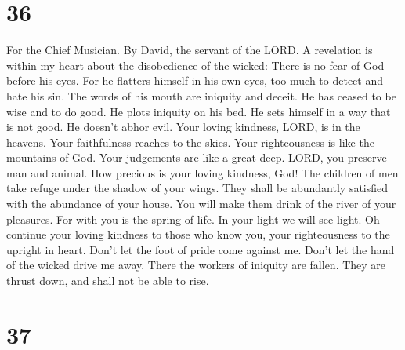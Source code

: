 \hypertarget{section-35}{%
\section{36}\label{section-35}}

For the Chief Musician. By David, the servant of the LORD. 
A revelation is within my heart about the disobedience of the wicked:
There is no fear of God before his eyes.  For he flatters
himself in his own eyes, too much to detect and hate his sin.
 The words of his mouth are iniquity and deceit. He has
ceased to be wise and to do good.  He plots iniquity on his
bed. He sets himself in a way that is not good. He doesn't abhor evil.
 Your loving kindness, LORD, is in the heavens. Your
faithfulness reaches to the skies.  Your righteousness is
like the mountains of God. Your judgements are like a great deep. LORD,
you preserve man and animal.  How precious is your loving
kindness, God! The children of men take refuge under the shadow of your
wings.  They shall be abundantly satisfied with the
abundance of your house. You will make them drink of the river of your
pleasures.  For with you is the spring of life. In your
light we will see light.  Oh continue your loving kindness
to those who know you, your righteousness to the upright in heart.
 Don't let the foot of pride come against me. Don't let the
hand of the wicked drive me away.  There the workers of
iniquity are fallen. They are thrust down, and shall not be able to
rise.

\hypertarget{section-36}{%
\section{37}\label{section-36}}

